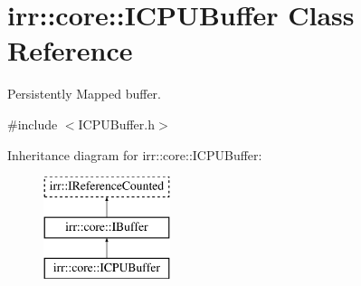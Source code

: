 \hypertarget{classirr_1_1core_1_1ICPUBuffer}{}\section{irr\+:\+:core\+:\+:I\+C\+P\+U\+Buffer Class Reference}
\label{classirr_1_1core_1_1ICPUBuffer}


Persistently Mapped buffer.  




{\ttfamily \#include $<$I\+C\+P\+U\+Buffer.\+h$>$}

Inheritance diagram for irr\+:\+:core\+:\+:I\+C\+P\+U\+Buffer\+:\begin{figure}[H]
\begin{center}
\leavevmode
\includegraphics[height=3.000000cm]{classirr_1_1core_1_1ICPUBuffer}
\end{center}
\end{figure}
